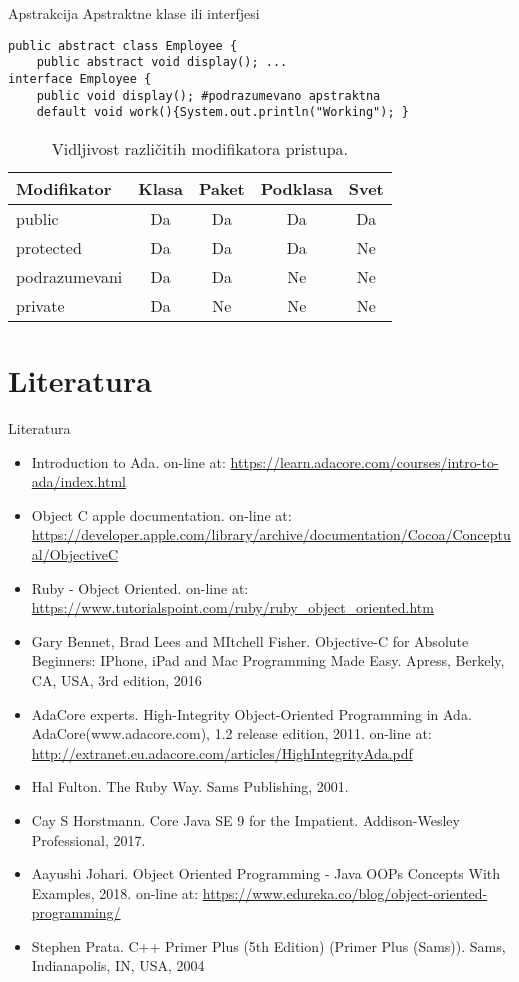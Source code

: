 \documentclass[14pt,aspectratio=169]{beamer}
\begin{document}
\begin{frame}[fragile]{Apstrakcija}
Apstraktne klase ili interfjesi
\begin{lstlisting}
public abstract class Employee {
	public abstract void display(); ...
interface Employee {
	public void display(); #podrazumevano apstraktna
	default void work(){System.out.println("Working"); }
\end{lstlisting}
\begin{table}
\begin{center}
\caption{Vidljivost različitih modifikatora pristupa.}
\begin{tabular}{|l|c|c|c|c|} \hline
Modifikator &Klasa &Paket &Podklasa &Svet\\ \hline
public &Da &Da &Da &Da\\ \hline
protected &Da &Da &Da &Ne\\ \hline
podrazumevani &Da &Da &Ne &Ne\\ \hline
private &Da &Ne &Ne &Ne\\ \hline
\end{tabular}
\label{tab:tabelaModPristupa}
\end{center}
\end{table}
\end{frame}


\section{Literatura}
\begin{frame}[fragile]{Literatura}
\begin{itemize}
	\scriptsize
	\item Introduction to Ada. on-line at: \url{https://learn.adacore.com/courses/intro-to-ada/index.html}
	\item Object C apple documentation. on-line at: \url{https://developer.apple.com/library/archive/documentation/Cocoa/Conceptual/ObjectiveC}
	\item Ruby - Object Oriented. on-line at: \url{https://www.tutorialspoint.com/ruby/ruby_object_oriented.htm}
	\item Gary Bennet, Brad Lees and MItchell Fisher. Objective-C for Absolute Beginners: IPhone, iPad and Mac Programming Made Easy. Apress, Berkely, CA, USA, 3rd edition, 2016
	\item AdaCore experts. High-Integrity Object-Oriented Programming in Ada. AdaCore(www.adacore.com), 1.2 release edition, 2011. on-line at: \url{http://extranet.eu.adacore.com/articles/HighIntegrityAda.pdf}
	\item Hal Fulton. The Ruby Way. Sams Publishing, 2001.
	\item Cay S Horstmann. Core Java SE 9 for the Impatient. Addison-Wesley Professional, 2017.
	\item Aayushi Johari. Object Oriented Programming - Java OOPs Concepts With Examples, 2018. on-line at: \url{https://www.edureka.co/blog/object-oriented-programming/}
	\item Stephen Prata. C++ Primer Plus (5th Edition) (Primer Plus (Sams)). Sams, Indianapolis, IN, USA, 2004
\end{itemize}

\end{frame}
\end{document}
